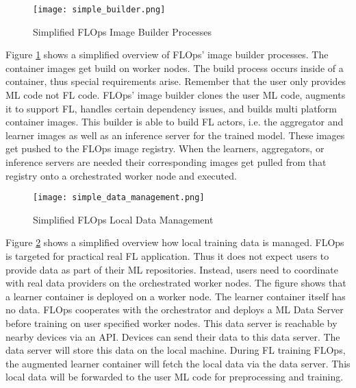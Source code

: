\begin{figure}[h]
    \centering
    \texttt{[image: simple\_builder.png]}
    \caption{Simplified FLOps Image Builder Processes}
    \label{fig:flops_simple_image_builder}
\end{figure}

Figure \ref{fig:flops_simple_image_builder} shows a simplified overview of FLOps' image builder processes.
The container images get build on worker nodes.
The build process occurs inside of a container, thus special requirements arise.
Remember that the user only provides ML code not FL code.
FLOps' image builder clones the user ML code, augments it to support FL, handles certain dependency issues, and builds multi platform container images.
This builder is able to build FL actors, i.e. the aggregator and learner images as well as an inference server for the trained model.
These images get pushed to the FLOps image registry.
When the learners, aggregators, or inference servers are needed their corresponding images get pulled from that registry onto a orchestrated worker node and executed.

\begin{figure}[h]
    \centering
    \texttt{[image: simple\_data\_management.png]}
    \caption{Simplified FLOps Local Data Management}
    \label{fig:flops_simple_data_management}
\end{figure}

Figure \ref{fig:flops_simple_data_management} shows a simplified overview how local training data is managed.
FLOps is targeted for practical real FL application.
Thus it does not expect users to provide data as part of their ML repositories.
Instead, users need to coordinate with real data providers on the orchestrated worker nodes.
The figure shows that a learner container is deployed on a worker node.
The learner container itself has no data. 
FLOps cooperates with the orchestrator and deploys a ML Data Server before training on user specified worker nodes.
This data server is reachable by nearby devices via an API.
Devices can send their data to this data server.
The data server will store this data on the local machine.
During FL training FLOps, the augmented learner container will fetch the local data via the data server.
This local data will be forwarded to the user ML code for preprocessing and training.



